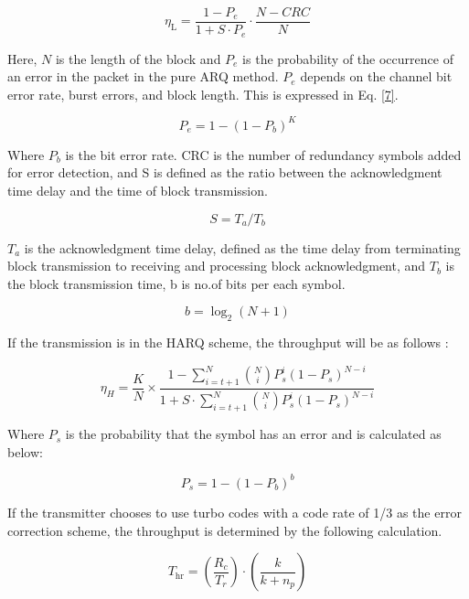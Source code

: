\documentclass[sn-mathphys-num]{sn-jnl}
\theoremstyle{thmstyleone}
\theoremstyle{thmstyletwo}%
\theoremstyle{thmstylethree}%
\begin{document}
\begin{equation}\label{6} 
    \eta_{\text{L}} = \frac{1 - P_e}{1 + S \cdot P_e} \cdot \frac{N - CRC}{N} 
\end{equation} 

Here, $N$ is the length of the block and ${P}_e$ is the probability of the occurrence of an error in the packet in the pure ARQ method. ${P}_e$ depends on the channel bit error rate, burst errors, and block length. This is expressed in Eq. \ref{7}.
 
\begin{equation}\label{7} 
    P_e = 1 - (1 - P_b)^K
\end{equation}

Where ${P}_b$ is the bit error rate. CRC is the number of redundancy symbols added for error detection, and S is defined as the ratio between the acknowledgment time delay and the time of block transmission.

\begin{equation}\label{8}
     S = T_a / T_b
\end{equation}

${T}_a$ is the acknowledgment time delay, defined as the time delay from terminating block transmission to receiving and processing block acknowledgment, and ${T}_b$ is the block transmission time, b is no.of bits per each symbol.

\begin{equation}\label{9}
    b = \log_2(N+1)
\end{equation}

If the transmission is in the HARQ scheme, the throughput will be as follows :

\begin{equation}\label{10}
    \eta_H = \frac{K}{N} \times \frac{1 - \sum_{i=t+1}^{N} \binom{N}{i} P_s^i (1-P_s)^{N-i}}{1 + S \cdot \sum_{i=t+1}^{N} \binom{N}{i} P_s^i (1-P_s)^{N-i}}
\end{equation}

Where ${P}_s$ is the probability that the symbol has an error and is calculated as below: 
 
\begin{equation}\label{11}
    P_s = 1 - (1 - P_b)^b
\end{equation}

If the transmitter chooses to use turbo codes with a code rate of 1/3 as the error correction scheme, the throughput is determined by the following calculation.

 \begin{equation}
T_{\text{hr}} = \left(\frac{R_{c}}{T_{r}}\right) \cdot \left(\frac{k}{k + n_{p}}\right)
\end{equation}
\end{document}

